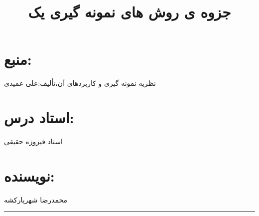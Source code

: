 	\title{جزوه ی روش های نمونه گیری یک}
\maketitle
{}
\section*{منبع:}
نظریه نمونه گیری و کاربردهای آن،تألیف:علی عمیدی
\section*{استاد درس:}
استاد فیروزه حقیقی
\section*{نویسنده:}
محمدرضا شهریارکشه
\\
\rule{\textwidth}{0.4pt}